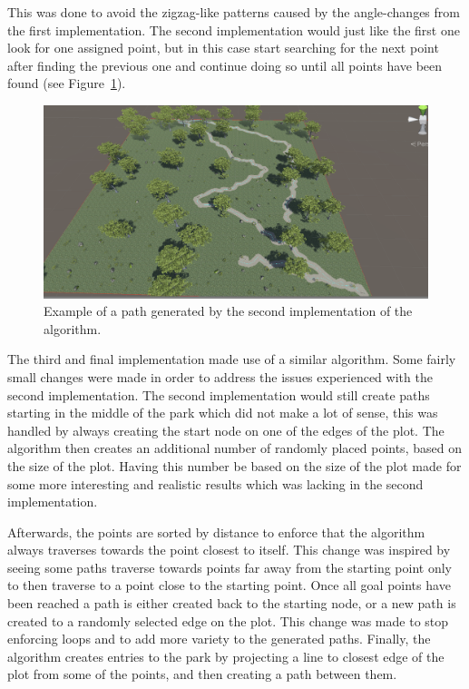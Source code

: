 This was done to avoid the zigzag-like patterns caused by the angle-changes from the first implementation.
The second implementation would just like the first one look for one assigned point, but in this case start searching for the next point after finding the previous one and continue doing so until all points have been found (see Figure~\ref{fig:texsplat}). 
\begin{figure}[H]
  \centering
  \includegraphics[width=0.85\linewidth]{figure/texturesplat}
  \caption{Example of a path generated by the second implementation of the algorithm.}
  \label{fig:texsplat}
\end{figure}
The third and final implementation made use of a similar algorithm.
Some fairly small changes were made in order to address the issues experienced with the second implementation.
The second implementation would still create paths starting in the middle of the park which did not make a lot of sense, this was handled by always creating the start node on one of the edges of the plot.
The algorithm then creates an additional number of randomly placed points, based on the size of the plot.
Having this number be based on the size of the plot made for some more interesting and realistic results which was lacking in the second implementation.

Afterwards, the points are sorted by distance to enforce that the algorithm always traverses towards the point closest to itself. 
This change was inspired by seeing some paths traverse towards points far away from the starting point only to then traverse to a point close to the starting point.
Once all goal points have been reached a path is either created back to the starting node, or a new path is created to a randomly selected edge on the plot. 
This change was made to stop enforcing loops and to add more variety to the generated paths.
Finally, the algorithm creates entries to the park by projecting a line to closest edge of the plot from some of the points, and then creating a path between them. 
 
